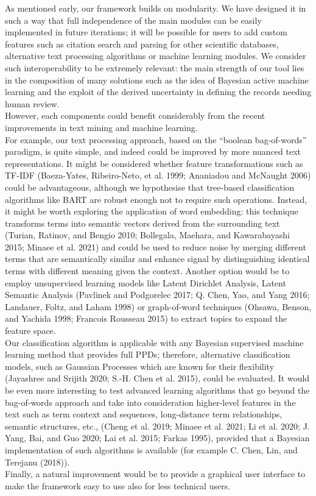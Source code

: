 \documentclass{article}
\begin{document}
As mentioned early, our framework builds on modularity. We have designed
it in such a way that full independence of the main modules can be
easily implemented in future iterations; it will be possible for users
to add custom features such as citation search and parsing for other
scientific databases, alternative text processing algorithms or machine
learning modules. We consider such interoperability to be extremely
relevant: the main strength of our tool lies in the composition of many
solutions such as the idea of Bayesian active machine learning and the
exploit of the derived uncertainty in defining the records needing human
review.\\
However, each components could benefit considerably from the recent
improvements in text mining and machine learning.\\
For example, our text processing approach, based on the ``boolean
bag-of-words'' paradigm, is quite simple, and indeed could be improved
by more nuanced text representations. It might be considered whether
feature transformations such as TF-IDF (Baeza-Yates, Ribeiro-Neto, et
al. 1999; Ananiadou and McNaught 2006) could be advantageous, although
we hypothesise that tree-based classification algorithms like BART are
robust enough not to require such operations. Instead, it might be worth
exploring the application of word embedding: this technique transforms
terms into semantic vectors derived from the surrounding text (Turian,
Ratinov, and Bengio 2010; Bollegala, Maehara, and Kawarabayashi 2015;
Minaee et al. 2021) and could be used to reduce noise by merging
different terms that are semantically similar and enhance signal by
distinguishing identical terms with different meaning given the context.
Another option would be to employ unsupervised learning models like
Latent Dirichlet Analysis, Latent Semantic Analysis (Pavlinek and
Podgorelec 2017; Q. Chen, Yao, and Yang 2016; Landauer, Foltz, and Laham
1998) or graph-of-word techniques (Ohsawa, Benson, and Yachida 1998;
Francois Rousseau 2015) to extract topics to expand the feature space.\\
Our classification algorithm is applicable with any Bayesian supervised
machine learning method that provides full PPDs; therefore, alternative
classification models, such as Gaussian Processes which are known for
their flexibility (Jayashree and Srijith 2020; S.-H. Chen et al. 2015),
could be evaluated. It would be even more interesting to test advanced
learning algorithms that go beyond the bag-of-words approach and take
into consideration higher-level features in the text such as term
context and sequences, long-distance term relationships, semantic
structures, etc., (Cheng et al. 2019; Minaee et al. 2021; Li et al.
2020; J. Yang, Bai, and Guo 2020; Lai et al. 2015; Farkas 1995),
provided that a Bayesian implementation of such algorithms is available
(for example C. Chen, Lin, and Terejanu (2018)).\\
Finally, a natural improvement would be to provide a graphical user
interface to make the framework easy to use also for less technical
users.
\end{document}
